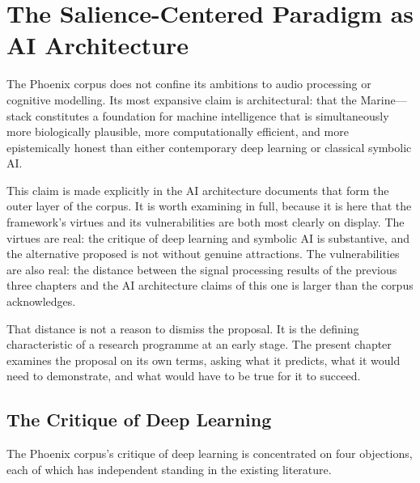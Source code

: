 
\chapter{The Salience-Centered Paradigm as AI Architecture}
\label{ch:ai-architecture}


\noindent
The Phoenix corpus does not confine its ambitions to audio
processing or cognitive modelling. Its most expansive claim is
architectural: that the Marine--\MEMeight{}--\HCFone{} stack
constitutes a foundation for machine intelligence that is
simultaneously more biologically plausible, more computationally
efficient, and more epistemically honest than either contemporary
deep learning or classical symbolic AI.

This claim is made explicitly in the AI architecture documents
that form the outer layer of the corpus. It is worth examining
in full, because it is here that the framework's virtues and
its vulnerabilities are both most clearly on display. The virtues
are real: the critique of deep learning and symbolic AI is
substantive, and the alternative proposed is not without genuine
attractions. The vulnerabilities are also real: the distance
between the signal processing results of the previous three chapters
and the AI architecture claims of this one is larger than the
corpus acknowledges.

That distance is not a reason to dismiss the proposal. It is the
defining characteristic of a research programme at an early stage.
The present chapter examines the proposal on its own terms,
asking what it predicts, what it would need to demonstrate, and
what would have to be true for it to succeed.

\section{The Critique of Deep Learning}
\label{sec:critique-dl}

The Phoenix corpus's critique of deep learning is concentrated
on four objections, each of which has independent standing in
the existing literature.

